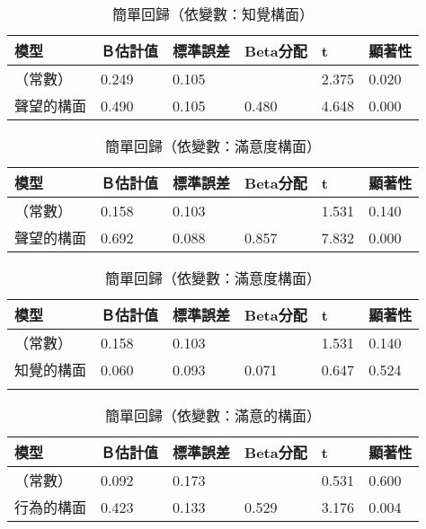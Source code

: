 \begin{table}[htb]
\caption{簡單回歸（依變數：知覺構面）}
\label{tab:r1}
\renewcommand{\arraystretch}{1.2} %
\arrayrulewidth=1pt               %
\tabcolsep=10pt                   %
\begin{tabular}[t]{llllll}  %
\hline
 模型&Ｂ估計值&標準誤差&Beta分配&t&顯著性\\
\hline
（常數）&0.249&0.105&&2.375&0.020\\
聲望的構面&0.490&0.105&0.480&4.648&0.000\\
\hline
\end{tabular}
\end{table}

\begin{table}[htb]
\caption{簡單回歸（依變數：滿意度構面）}
\label{tab:r2}
\renewcommand{\arraystretch}{1.2} %
\arrayrulewidth=1pt               %
\tabcolsep=10pt                   %
\begin{tabular}[t]{llllll}  %
\hline
 模型&Ｂ估計值&標準誤差&Beta分配&t&顯著性\\
\hline
（常數）&0.158&0.103&&1.531&0.140\\
聲望的構面&0.692&0.088&0.857&7.832&0.000\\
\hline
\end{tabular}
\end{table}

\begin{table}[htb]
\caption{簡單回歸（依變數：滿意度構面）}
\label{tab:r3}
\renewcommand{\arraystretch}{1.2} %
\arrayrulewidth=1pt               %
\tabcolsep=10pt                   %
\begin{tabular}[t]{llllll}  %
\hline
 模型&Ｂ估計值&標準誤差&Beta分配&t&顯著性\\
\hline
（常數）&0.158&0.103&&1.531&0.140\\
知覺的構面&0.060&0.093&0.071&0.647&0.524\\
\hline
\centering
\end{tabular}
\end{table}

\begin{table}[htb]
\caption{簡單回歸（依變數：滿意的構面）}
\label{tab:r03}
\renewcommand{\arraystretch}{1.2} %
\arrayrulewidth=1pt               %
\tabcolsep=10pt                   %
\begin{tabular}[t]{llllll}  %
\hline
 模型&Ｂ估計值&標準誤差&Beta分配&t&顯著性\\
\hline
（常數）&0.092&0.173& &0.531&0.600\\
行為的構面&0.423&0.133&0.529&3.176&0.004\\
\hline
\end{tabular}
\end{table}


